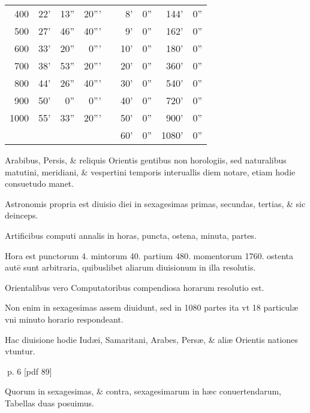 \begin{parnumbers}
\begin{wraptable}{r}{0.55\textwidth}
\begin{tabular}{ @{}r@{}  @{}r@{}r@{}r@{}  c  @{}r @{} r @{} r@{} r@{}  }
  400
& 22'
& 13''
& 20'''
&
& 8'
& 0''
& 144'
& 0''
\\
  500
& 27'
& 46''
& 40'''
&
& 9'
& 0''
& 162'
& 0''
\\
  600
& 33'
& 20''
& 0'''
&
& 10'
& 0''
& 180'
& 0''
\\
  700
& 38'
& 53''
& 20'''
&
& 20'
& 0''
& 360'
& 0''
\\
  800
& 44'
& 26''
& 40'''
&
& 30'
& 0''
& 540'
& 0''
\\
  900
& 50'
& 0''
& 0'''
&
& 40'
& 0''
& 720'
& 0''
\\
  1000
& 55'
& 33''
& 20'''
&
& 50'
& 0''
& 900'
& 0''
\\

&
&
&
&
& 60'
& 0''
& 1080'
& 0''
\\
\cline{1-4} \cline{6-9}
\end{tabular}
\end{wraptable}


Arabibus, Persis, \& reliquis Orientis gentibus non horologiis, sed naturalibus matutini, meridiani, \& vespertini temporis interuallis diem notare, etiam hodie consuetudo manet.

Astronomis propria  est diuisio diei in sexagesimas primas, secundas, tertias, \& sic deinceps.

Artificibus computi annalis in horas, puncta, ostena, minuta, partes.

Hora est punctorum 4. mintorum 40. partium 480. momentorum 1760. ostenta autē sunt arbitraria, quibuslibet aliarum diuisionum in illa resolutis.

 Orientalibus vero Computatoribus compendiosa horarum resolutio est.

Non enim in sexagesimas assem diuidunt, sed in 1080 partes ita vt 18 particulæ vni minuto horario respondeant.

Hac diuisione hodie Iudæi, Samaritani, Arabes, Persæ, \& aliæ Orientis nationes vtuntur.

\end{parnumbers}
\clearpage
p. 6 [pdf 89]

\begin{parnumbers}

 Quorum in sexagesimas, \& contra, sexagesimarum in hæc conuertendarum, Tabellas duas posuimus.

\end{parnumbers}

